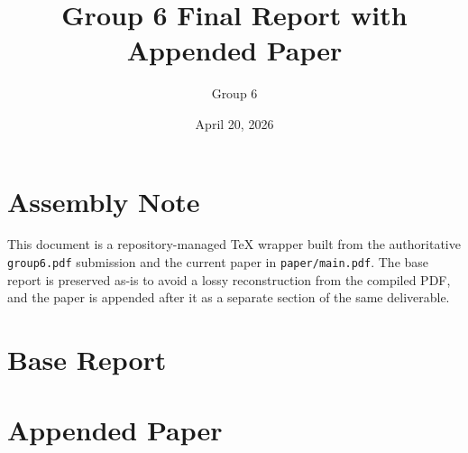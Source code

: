 \documentclass[11pt]{report}
\title{Group 6 Final Report with Appended Paper}
\author{Group 6}
\date{April 20, 2026}
\newcommand{\groupSixPdfPath}{../../group6.pdf}
\renewcommand{\groupSixPdfPath}{group6.pdf}%
\newcommand{\appendedPaperPdfPath}{../../paper/main.pdf}
\renewcommand{\appendedPaperPdfPath}{paper/main.pdf}%
\begin{document}
\maketitle
\clearpage
{}

\chapter*{Assembly Note}
This document is a repository-managed TeX wrapper built from the authoritative
\texttt{group6.pdf} submission and the current paper in \texttt{paper/main.pdf}.
The base report is preserved as-is to avoid a lossy reconstruction from the
compiled PDF, and the paper is appended after it as a separate section of the
same deliverable.

\tableofcontents
\clearpage
{}

\clearpage

\chapter*{Base Report}
{\hypersetup{pageanchor=false}

}

\appendix

\chapter*{Appended Paper}
{\hypersetup{pageanchor=false}

}
\end{document}
